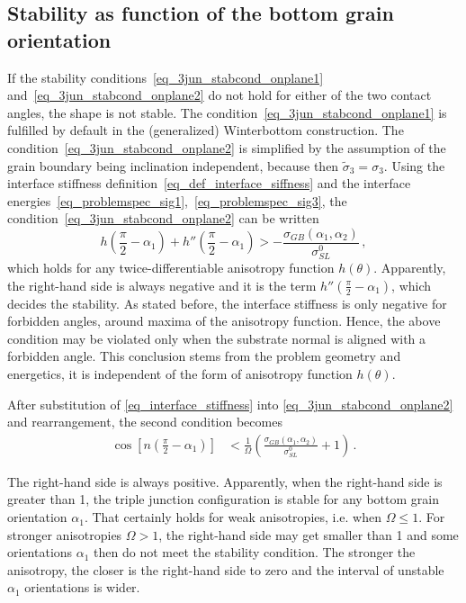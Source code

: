 	\subsection{Stability as function of the bottom grain orientation}
	If the stability conditions~\eqref{eq_3jun_stabcond_onplane1} and~\eqref{eq_3jun_stabcond_onplane2} do not hold for either of the two contact angles, the shape is not stable. The condition~\eqref{eq_3jun_stabcond_onplane1} is fulfilled by default in the (generalized) Winterbottom construction. The condition~\eqref{eq_3jun_stabcond_onplane2} is simplified by the assumption of the grain boundary being inclination independent, because then $\tilde{\sigma}_3=\sigma_3$. Using the interface stiffness definition~\eqref{eq_def_interface_siffness} and the interface energies~\eqref{eq_problemspec_sig1},~\eqref{eq_problemspec_sig3}, the condition~\eqref{eq_3jun_stabcond_onplane2} can be written
	\begin{equation} \label{eq_stabcond_general_explicit}
		\textstyle h(\frac{\pi}{2}-\alpha_1) + h''(\frac{\pi}{2}-\alpha_1) > \displaystyle -\frac{\sigma_{GB}(\alpha_1,\alpha_2)}{\sigma_{SL}^0} \,,
	\end{equation}
	which holds for any twice-differentiable anisotropy function $h(\theta)$. Apparently, the right-hand side is always negative and it is the term $h''(\frac{\pi}{2}-\alpha_1)$, which decides the stability. As stated before, the interface stiffness is only negative for forbidden angles, around maxima of the anisotropy function. Hence, the above condition may be violated only when the substrate normal is aligned with a forbidden angle. This conclusion stems from the problem geometry and energetics, it is independent of the form of anisotropy function $h(\theta)$.
	
	After substitution of \eqref{eq_interface_stiffness} into \eqref{eq_3jun_stabcond_onplane2} and rearrangement, the second condition becomes
	\begin{align}
		\textstyle\cos\left[n(\frac{\pi}{2}-\alpha_1)\right]&<\frac{1}{\Omega}\left(\frac{\sigma_{GB}(\alpha_1,\alpha_2)}{\sigma_{SL}^0}+1\right) \,. \label{eq_3jun_stabcond_applied}
	\end{align}
	
	The right-hand side is always positive. Apparently, when the right-hand side is greater than 1, the triple junction configuration is stable for any bottom grain orientation $\alpha_1$. That certainly holds for weak anisotropies, i.e. when $\Omega\leq 1$. For stronger anisotropies $\Omega>1$, the right-hand side may get smaller than 1 and some orientations $\alpha_1$ then do not meet the stability condition. The stronger the anisotropy, the closer is the right-hand side to zero and the interval of unstable $\alpha_1$ orientations is wider.  
	
